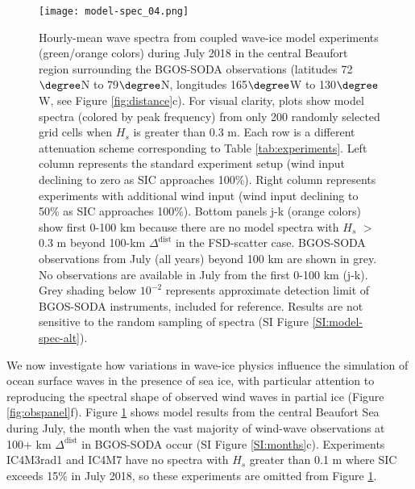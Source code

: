 \documentclass [11pt, proquest] {uwthesis}[2020/02/24]
\begin{document}
\begin{figure}
    \noindent\texttt{[image: model-spec\_04.png]}
    \caption{
    Hourly-mean wave spectra from coupled wave-ice model experiments (green/orange colors) during July 2018 in the central Beaufort region surrounding the BGOS-SODA observations (latitudes 72$\degree$N to 79$\degree$N, longitudes 165$\degree$W to 130$\degree$W, see Figure \ref{fig:distance}c). For visual clarity, plots show model spectra (colored by peak frequency) from only 200 randomly selected grid cells when $H_s$ is greater than 0.3 m. Each row is a different attenuation scheme corresponding to Table \ref{tab:experiments}. Left column represents the standard experiment setup (wind input declining to zero as SIC approaches 100\%). Right column represents experiments with additional wind input (wind input declining to 50\% as SIC approaches 100\%). Bottom panels j-k (orange colors) show first 0-100 km because there are no model spectra with $H_s$ $>$ 0.3 m beyond 100-km $\Delta^{ \mathrm{dist}}$ in the FSD-scatter case. BGOS-SODA observations from July (all years) beyond 100 km are shown in grey. No observations are available in July from the first 0-100 km (j-k). Grey shading below $10^{-2}$ represents approximate detection limit of BGOS-SODA instruments, included for reference. Results are not sensitive to the random sampling of spectra (SI Figure \ref{SI:model-spec-alt}).}
    \label{fig:model-spec}
\end{figure}

We now investigate how variations in wave-ice physics influence the simulation of ocean surface waves in the presence of sea ice, with particular attention to reproducing the spectral shape of observed wind waves in partial ice (Figure \ref{fig:obspanel}f). Figure \ref{fig:model-spec} shows model results from the central Beaufort Sea during July, the month when the vast majority of wind-wave observations at 100+ km $\Delta^{ \mathrm{dist}}$ in BGOS-SODA occur (SI Figure \ref{SI:months}c). Experiments IC4M3rad1 and IC4M7 have no spectra with $H_s$ greater than 0.1 m where SIC exceeds 15\% in July 2018, so these experiments are omitted from Figure \ref{fig:model-spec}.  
\end{document}
